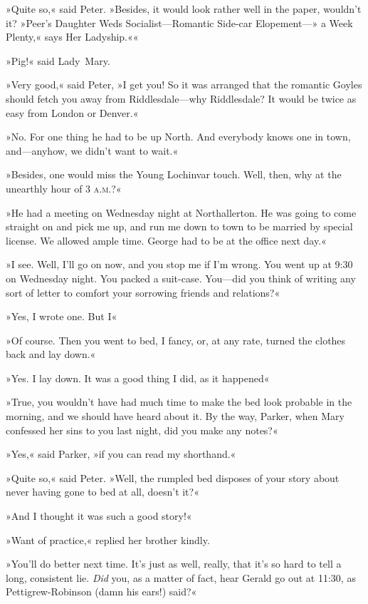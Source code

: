 »Quite so,« said Peter. »Besides, it would look rather well in the paper, wouldn't it? »Peer's Daughter Weds Socialist—Romantic Side-car Elopement—» a Week Plenty,« says Her Ladyship.««

»Pig!« said Lady~Mary.

»Very good,« said Peter, »I get you! So it was arranged that the romantic Goyles should fetch you away from Riddlesdale—why Riddlesdale? It would be twice as easy from London or Denver.«

»No. For one thing he had to be up North. And everybody knows one in town, and—anyhow, we didn't want to wait.«

»Besides, one would miss the Young Lochinvar touch. Well, then, why at the unearthly hour of 3 \textsc{a.m.}?«

»He had a meeting on Wednesday night at Northallerton. He was going to come straight on and pick me up, and run me down to town to be married by special license. We allowed ample time. George had to be at the office next day.«

»I see. Well, I'll go on now, and you stop me if I'm wrong. You went up at 9:30 on Wednesday night. You packed a suit-case. You—did you think of writing any sort of letter to comfort your sorrowing friends and relations?«

»Yes, I wrote one. But I\longdash«

»Of course. Then you went to bed, I fancy, or, at any rate, turned the clothes back and lay down.«

»Yes. I lay down. It was a good thing I did, as it happened\longdash«

»True, you wouldn't have had much time to make the bed look probable in the morning, and we should have heard about it. By the way, Parker, when Mary confessed her sins to you last night, did you make any notes?«

»Yes,« said Parker, »if you can read my shorthand.«

»Quite so,« said Peter. »Well, the rumpled bed disposes of your story about never having gone to bed at all, doesn't it?«

»And I thought it was such a good story!«

»Want of practice,« replied her brother kindly.

»You'll do better next time. It's just as well, really, that it's so hard to tell a long, consistent lie. \textit{Did} you, as a matter of fact, hear Gerald go out at 11:30, as Pettigrew-Robinson (damn his ears!) said?«

